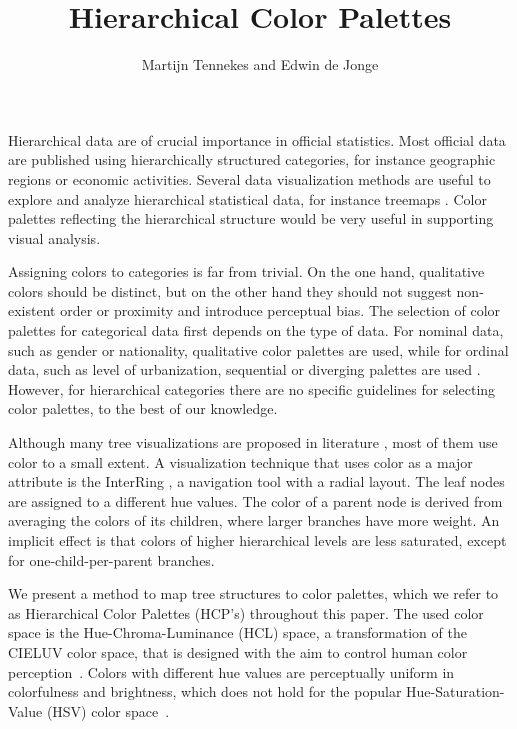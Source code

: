 \documentclass[journal]{vgtc}                %
\title{Hierarchical Color Palettes}
\author{Martijn Tennekes and Edwin de Jonge}
\begin{document}


\maketitle

Hierarchical data are of crucial importance in official statistics. Most official data are published using hierarchically structured categories, for instance geographic regions or economic activities. Several data visualization methods are useful to explore and analyze hierarchical statistical data, for instance treemaps
\cite{shneiderman1992,tennekes2011b}. Color palettes reflecting the hierarchical structure would be very useful in supporting visual analysis.

Assigning colors to categories is far from trivial. On the one hand, qualitative colors should be distinct, but on the other hand they should not suggest non-existent order or proximity and introduce perceptual bias. The selection of color palettes for categorical data first depends on the type of data. For nominal data, such as gender or nationality, qualitative color palettes are used, while for ordinal data, such as level of urbanization, sequential or diverging palettes are used \cite{brewer03, zeileis2009}. However, for hierarchical categories there are no specific guidelines for selecting color palettes, to the best of our knowledge.

Although many tree visualizations are proposed in literature \cite{schulz2011}, most of them use color to a small extent. A visualization technique that uses color as a major attribute is the InterRing \cite{yang2002}, a navigation tool with a radial layout. The leaf nodes are assigned to a different hue values. The color of a parent node is derived from averaging the colors of its children, where larger branches have more weight. An implicit effect is that colors of higher hierarchical levels are less saturated, except for one-child-per-parent branches.

We present a method to map tree structures to color palettes, which we refer to as Hierarchical Color Palettes (HCP's) throughout this paper. The used color space is the Hue-Chroma-Luminance (HCL) space, a transformation of the CIELUV color space, that is designed with the aim to control human color perception~\cite{ihaka2003}. Colors with different hue values are perceptually uniform in colorfulness and brightness, which does not hold for the popular Hue-Saturation-Value (HSV) color space~\cite{zeileis2009}.
\end{document}
